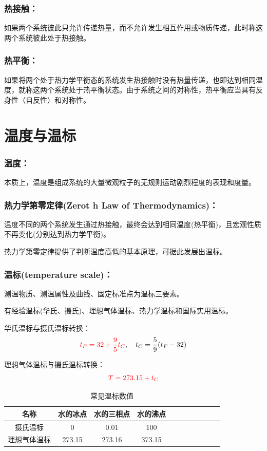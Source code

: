 \documentclass[zihao=5,UTF8]{report}
\begin{document}
\subsubsection{热接触：}
如果两个系统彼此只允许传递热量，而不允许发生相互作用或物质传递，此时称这两个系统彼此处于热接触。
\subsubsection{热平衡：}
如果将两个处于热力学平衡态的系统发生热接触时没有热量传递，也即达到相同温度，就称这两个系统处于热平衡状态。{\color{gray}\small 由于系统之间的对称性，热平衡应当具有反身性（自反性）和对称性。}

\section{温度与温标}
\subsubsection{温度：}
本质上，温度是组成系统的大量微观粒子的无规则运动剧烈程度的表现和度量。
\subsubsection{热力学第零定律(Zerot h Law of Thermodynamics)：}
温度不同的两个系统发生通过热接触，最终会达到相同温度(热平衡)，且宏观性质不再变化(分别达到热力学平衡)。\par
{\color{gray}\small 热力学第零定律提供了判断温度高低的基本原理，可据此发展出温标。}
\subsubsection{温标(temperature scale)：}
测温物质、测温属性及曲线、固定标准点为温标三要素。\par
有经验温标(华氏、摄氏)、理想气体温标、热力学温标和国际实用温标。\par
华氏温标与摄氏温标转换：
\begin{equation}
    {\color{red} t_F = 32 + \frac{9}{5}t_C},\ \ \  t_C = \frac{5}{9}(t_F-32)
\end{equation}\par
理想气体温标与摄氏温标转换：
\begin{equation}
    {\color{red} T = 273.15 + t_C}
\end{equation}
\begin{table}[H]
    \centering
    \caption{常见温标数值}
    \begin{tabular}{ccccccccccc}
    \toprule
    名称 & 水的冰点 & 水的三相点 & 水的沸点\\
    \midrule
    摄氏温标 & 0 & 0.01 & 100\\
    理想气体温标& 273.15& 273.16 & 373.15\\
    \bottomrule
    \end{tabular}
\end{table}
\end{document}
